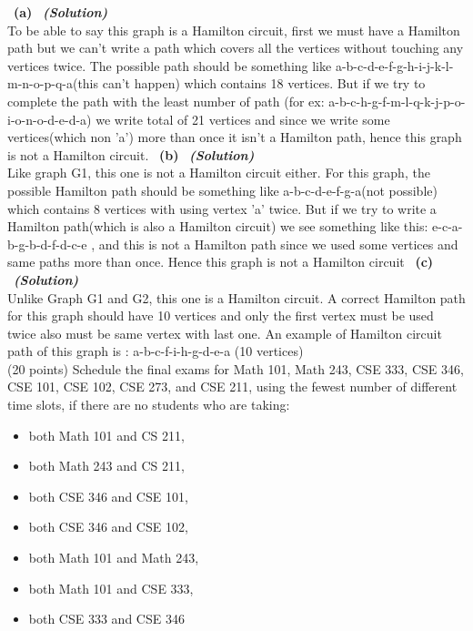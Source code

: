 \documentclass[a4 paper]{article}
\numberwithin{equation}{section}
\newcommand{\problem}[2]{~\\\fbox{\textbf{Problem #1}}\hfill (#2 points)\newline\newline}
\newcommand{\subproblem}[1]{~\newline\textbf{(#1)}}
\newcommand{\solution}{~\newline\textbf{\textit{(Solution)}} }
\newcommand{\0}{\mathbf{0}}
\begin{document}
\subproblem{a} \solution\\
\newline
To be able to say this graph is a Hamilton circuit, first we must have a Hamilton path but we can't write a path which covers all the vertices without touching any vertices twice. The possible path should be something like a-b-c-d-e-f-g-h-i-j-k-l-m-n-o-p-q-a(this can't happen) which contains 18 vertices. But if we try to complete the path with the least number of path (for ex:  a-b-c-h-g-f-m-l-q-k-j-p-o-i-o-n-o-d-e-d-a) we write total of 21 vertices and since we write some vertices(which non 'a') more than once it isn't a Hamilton path, hence this graph is not a Hamilton circuit.
\newline
\subproblem{b} \solution\\
\newline
Like graph G1, this one is not a Hamilton circuit either. For this graph, the possible Hamilton path should be something like a-b-c-d-e-f-g-a(not possible) which contains 8 vertices with using vertex 'a' twice. But if we try to write a Hamilton path(which is also a Hamilton circuit) we see something like this: e-c-a-b-g-b-d-f-d-c-e , and this is not a Hamilton path since we used some vertices and same paths more than once. Hence this graph is not a Hamilton circuit
\newline
\subproblem{c} \solution\\
\newline
Unlike Graph G1 and G2, this one is a Hamilton circuit. A correct Hamilton path for this graph should have 10 vertices and only the first vertex must be used twice also must be same vertex with last one. An example of Hamilton circuit path of this graph is : a-b-c-f-i-h-g-d-e-a (10 vertices)
\newline
\newpage
\problem{3: Applications on Graphs}{20}
Schedule the final exams for Math 101, Math 243, CSE 333, CSE 346, CSE 101, CSE 102, CSE 273, and CSE 211, using the fewest number of different time slots, if there are no students who are taking:
\begin{itemize}
	\item both Math 101 and CS 211,
	\item both Math 243 and CS 211,
	\item both CSE 346 and CSE 101,
	\item both CSE 346 and CSE 102,
	\item both Math 101 and Math 243,
	\item both Math 101 and CSE 333,
	\item both CSE 333 and CSE 346
\end{itemize}
\end{document}
